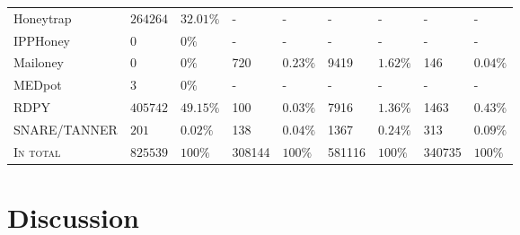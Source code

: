 \begin{table}
\begin{tabularx}{\linewidth}{l|XX|XX|XX|XX}
        Honeytrap          & $264264$                               & $32.01\%$                               & -                                & -                                  & -               & -             & -               & -             \\
        IPPHoney           & $0$                                    & $0\%$                                   & -                                & -                                  & -               & -             & -               & -             \\
        Mailoney           & $0$                                    & $0\%$                                   & 720                              & $0.23\%$                           & 9419            & $1.62\%$      & 146             & $0.04\%$      \\
        MEDpot             & $3$                                    & $0\%$                                   & -                                & -                                  & -               & -             & -               & -             \\
        RDPY               & $405742$                               & $49.15\%$                               & 100                              & $0.03\%$                           & 7916            & $1.36\%$      & 1463            & $0.43\%$      \\
        SNARE/TANNER       & $201$                                  & $0.02\%$                                & 138                              & $0.04\%$                           & 1367            & $0.24\%$      & 313             & $0.09\%$      \\
        \hline
        \textsc{In total}  & $825539$                               & $100\%$                                 & 308144                           & $100\%$                            & 581116          & $100\%$       & 340735          & $100\%$       \\
        \bottomrule
    \end{tabularx}
    \label{tab:overview-honeypots-attacks}
\end{table}

\section{Discussion}

